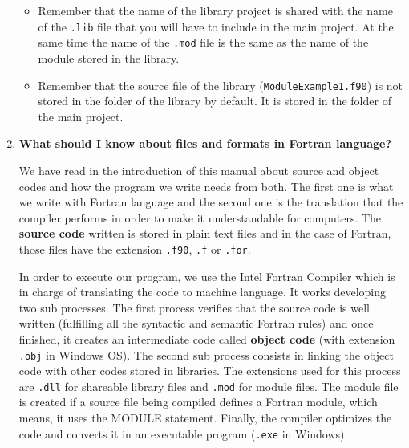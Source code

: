 \begin{enumerate}
    \begin{IN}
        \begin{itemize}
            \item Remember that the name of the library project is shared with the name of the \texttt{.lib} file that you will have to include in the main project. At the same time the name of the \texttt{.mod} file is the same as the name of the module stored in the library. 
            
            \item Remember that the source file of the library (\texttt{ModuleExample1.f90}) is not stored in the folder of the library by default. It is stored in the folder of the main project.
        \end{itemize}
    \end{IN}

    

	
    \FloatBarrier
    \item \textbf{What should I know about files and formats in Fortran language?}
    
    We have read in the introduction of this manual about source and object codes and how the program we write needs from both. The first one is what we write with Fortran language and the second one is the translation that the compiler performs in order to make it understandable for computers. The \textbf{source code} written is stored in plain text files and in the case of Fortran, those files have the extension \texttt{.f90}, \texttt{.f} or \texttt{.for}. 
    
    \newpage
    In order to execute our program, we use the Intel\textregistered \hspace{0.1cm} Fortran Compiler which is in charge of translating the code to machine language. It works developing two sub processes. The first process verifies that the source code is well written (fulfilling all the syntactic and semantic Fortran rules) and once finished, it creates an intermediate code called \textbf{object code} (with extension \texttt{.obj} in Windows OS). The second sub process consists in linking the object code with other codes stored in libraries. The extensions used for this process are \texttt{.dll} for shareable library files and \texttt{.mod} for module files. The module file is created if a source file being compiled defines a Fortran module, which means, it uses the MODULE statement. Finally, the compiler optimizes the code and converts it in an executable program (\texttt{.exe} in Windows).
    

\end{enumerate}

